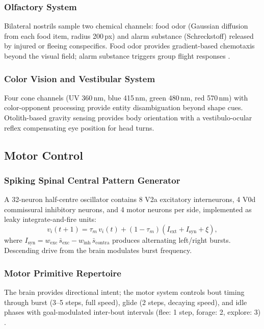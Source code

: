 \documentclass[12pt]{article}
\begin{document}
\subsubsection{Olfactory System}

Bilateral nostrils sample two chemical channels: food odor
(Gaussian diffusion from each food item, radius 200\,px) and
alarm substance (Schreckstoff) released by injured or fleeing
conspecifics.
Food odor provides gradient-based chemotaxis beyond the visual field;
alarm substance triggers group flight responses
\citep{jesuthasan2012}.

\subsubsection{Color Vision and Vestibular System}

Four cone channels (UV 360\,nm, blue 415\,nm, green 480\,nm,
red 570\,nm) with color-opponent processing provide entity
disambiguation beyond shape cues.
Otolith-based gravity sensing provides body orientation with a
vestibulo-ocular reflex compensating eye position for head turns.

\subsection{Motor Control}\label{sec:motor}

\subsubsection{Spiking Spinal Central Pattern Generator}

A 32-neuron half-centre oscillator contains 8 V2a excitatory
interneurons, 4 V0d commissural inhibitory neurons, and 4 motor
neurons per side, implemented as leaky integrate-and-fire units:
\begin{equation}\label{eq:cpg}
  v_i(t{+}1) = \tau_m\,v_i(t) + (1-\tau_m)(I_\text{ext}
    + I_\text{syn} + \xi),
\end{equation}
where $I_\text{syn} = w_\text{exc}\,\bar{s}_\text{exc}
- w_\text{inh}\,\bar{s}_\text{contra}$ produces alternating
left/right bursts.
Descending drive from the brain modulates burst frequency.

\subsubsection{Motor Primitive Repertoire}

The brain provides directional intent; the motor system controls
bout timing through burst (3--5 steps, full speed), glide (2 steps,
decaying speed), and idle phases with goal-modulated inter-bout
intervals (flee: 1 step, forage: 2, explore: 3)
\citep{marques2018}.
\end{document}
